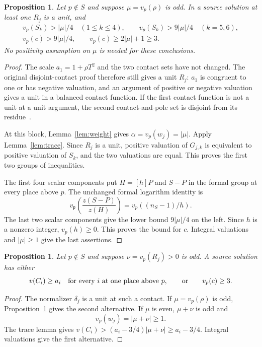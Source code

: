 \documentclass[11pt,a4paper]{article}
\newtheorem{proposition}[theorem]{Proposition}
\begin{document}
\begin{proposition}\label{prop:scalar}
Let $p\notin S$ and suppose $\mu=v_p(\rho)$ is odd. In a source
solution at least one $R_j$ is a unit, and
\begin{equation}\label{eq:scalarorders}
\begin{gathered}
 v_p(S_k)>|\mu|/4\quad(1\le k\le4),\qquad
 v_p(S_k)>9|\mu|/4\quad(k=5,6),\\
 v_p(c)>9|\mu|/4,\qquad
                     v_p(c)\ge2|\mu|+1\ge3.
\end{gathered}
\end{equation}
No positivity assumption on $\mu$ is needed for these conclusions.
\end{proposition}
\begin{proof}
The scale $a_1=1+\rho T^2$ and the two contact sets have not changed.
The original disjoint-contact proof therefore still gives a unit
$R_j$: $a_1$ is congruent to one or has negative valuation, and an
argument of positive or negative valuation gives a unit in a balanced
contact function. If the first contact function is not a unit at a
unit argument, the second contact-and-pole set is disjoint from its
residue~\cite[Section 3]{General}.

At this block, Lemma~\ref{lem:weight} gives
$\alpha=v_p(w_j)=|\mu|$. Apply Lemma~\ref{lem:trace}.
Since $R_j$ is a unit, positive valuation of $G_{j,k}$ is equivalent
to positive valuation of $S_k$, and the two valuations are equal.
This proves the first two groups of inequalities.

The first four scalar components put $H=[h]P$ and $S-P$ in the
formal group at every place above $p$. The unchanged formal logarithm
identity is
\[
 v_{\mathfrak p}\!\left(\frac{z(S-P)}{z(H)}\right)
                    =v_p((n_S-1)/h).
\]
The last two scalar components give the lower bound
$9|\mu|/4$ on the left. Since $h$ is a nonzero integer,
$v_p(h)\ge0$. This proves the bound for $c$. Integral valuations
and $|\mu|\ge1$ give the last assertions.
\end{proof}

\begin{proposition}\label{prop:mixed}
Let $p\notin S$ and suppose $\nu=v_p(R_j)>0$ is odd.
A source solution has either
\[
 v(C_i)\ge a_i\quad\hbox{for every $i$ at one place above $p$},
 \qquad\hbox{or}\qquad v_p(c)\ge3.
\]
\end{proposition}
\begin{proof}
The normalizer $\delta_j$ is a unit at such a contact. If
$\mu=v_p(\rho)$ is odd, Proposition~\ref{prop:scalar} gives the
second alternative. If $\mu$ is even, $\mu+\nu$ is odd and
\[
                 v_p(w_j)=|\mu+\nu|\ge1.
\]
The trace lemma gives
$v(C_i)>(a_i-3/4)|\mu+\nu|\ge a_i-3/4$.
Integral valuations give the first alternative.
\end{proof}
\end{document}

